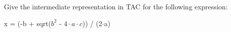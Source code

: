 Give the intermediate representation in TAC for the following expression: 
\begin{center}
    x = (-b + sqrt($b^2$ - $4\cdot a\cdot c$)) / (2$\cdot$a)
\end{center}